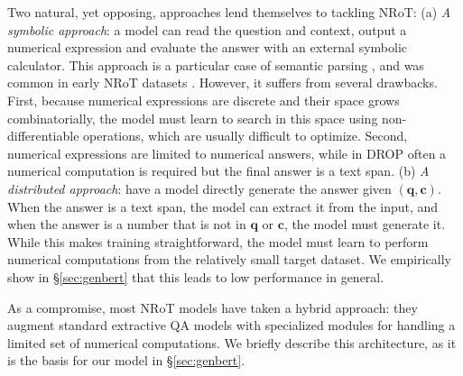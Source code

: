 \documentclass[11pt,a4paper]{article}
\newcommand\question{\mathbf{q}}
\newcommand\context{\mathbf{c   }}
\begin{document}
Two natural, yet opposing, approaches lend themselves to tackling NRoT:
(a) \emph{A symbolic approach}: a model can read the question and context, output a numerical expression and evaluate the answer with an external symbolic calculator. This approach is a particular case of semantic parsing \cite{kamath2019survey}, and was common in early NRoT datasets \cite{koncel2015parsing, roy2015solving, hosseini2014learning}. However, it suffers from several drawbacks. First, because numerical expressions are discrete and their space grows combinatorially, the model must learn to search in this space using non-differentiable operations, which are usually difficult to optimize. Second, numerical expressions are limited to numerical answers, while in \textsc{DROP} often a numerical computation is required but the final answer is a text span.
(b) \emph{A distributed approach}: have a model directly generate the answer
given $(\question,\context)$. When the answer is a text span, the model can
extract it from the input, and when the answer is a number that is not in $\question$ or
$\context$, the model must generate it. While this makes training straightforward, the model must learn to perform numerical computations from the relatively small target dataset. We empirically show in \S\ref{sec:genbert} that this leads to low performance in general.

As a compromise, most NRoT models \cite{dua2019drop, kinley2019nabert, hu2019multi, efrat2019tag} have taken a hybrid approach: they augment standard extractive QA models with specialized modules for handling a limited set of numerical computations.
We briefly describe this architecture, as it is the basis for our
model in \S\ref{sec:genbert}.
\end{document}
